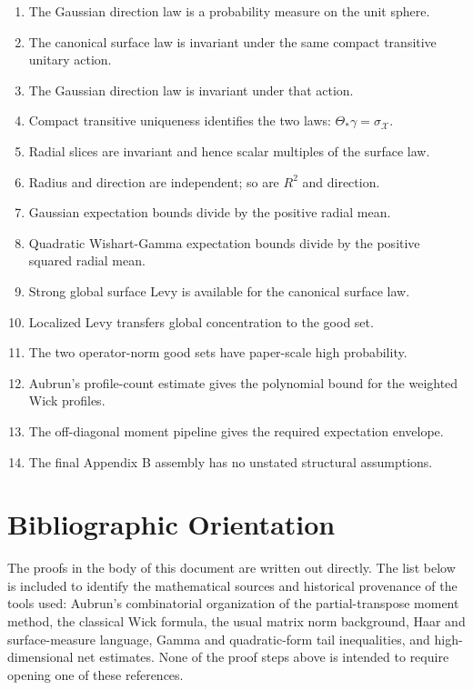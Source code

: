 \documentclass[11pt,oneside]{book}
\newcommand{\1}{\mathbf 1}
\begin{document}
\begin{enumerate}[label=\textbf{C\arabic*.}]
  \item The Gaussian direction law is a probability measure on the unit sphere.
  \item The canonical surface law is invariant under the same compact
  transitive unitary action.
  \item The Gaussian direction law is invariant under that action.
  \item Compact transitive uniqueness identifies the two laws:
  \(\Theta_*\gamma=\sigma_{\mathcal X}\).
  \item Radial slices are invariant and hence scalar multiples of the surface
  law.
  \item Radius and direction are independent; so are \(R^2\) and direction.
  \item Gaussian expectation bounds divide by the positive radial mean.
  \item Quadratic Wishart-Gamma expectation bounds divide by the positive
  squared radial mean.
  \item Strong global surface Levy is available for the canonical surface law.
  \item Localized Levy transfers global concentration to the good set.
  \item The two operator-norm good sets have paper-scale high probability.
  \item Aubrun's profile-count estimate gives the polynomial bound for the
  weighted Wick profiles.
  \item The off-diagonal moment pipeline gives the required expectation
  envelope.
  \item The final Appendix B assembly has no unstated structural assumptions.
\end{enumerate}

\chapter*{Bibliographic Orientation}

The proofs in the body of this document are written out directly.  The list
below is included to identify the mathematical sources and historical
provenance of the tools used: Aubrun's combinatorial organization of the
partial-transpose moment method, the classical Wick formula, the usual matrix
norm background, Haar and surface-measure language, Gamma and quadratic-form
tail inequalities, and high-dimensional net estimates.  None of the proof
steps above is intended to require opening one of these references.
\end{document}
